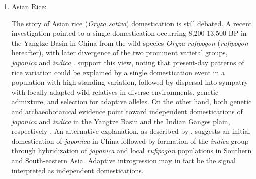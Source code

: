 \documentclass[11pt]{article}
\begin{document}
\begin{enumerate}







\item{Asian Rice:}

The story of Asian rice (\emph{Oryza sativa}) domestication is still debated.
A recent investigation pointed to a single domestication occurring 8,200-13,500 BP in the Yangtze Basin in China from the wild species \emph{Oryza rufipogon} (\emph{rufipogon} hereafter), with later divergence of the two prominent varietal groups, \emph{japonica} and \emph{indica} \cite{molina2011molecular}.
\cite{vaughan2008evolving} support this view, noting that present-day patterns of rice variation could be explained by a single domestication event in a population with high standing variation, followed by dispersal into sympatry with locally-adapted wild relatives in diverse environments, genetic admixture, and selection for adaptive alleles.
On the other hand, both genetic and archaeobotanical evidence point toward independent domestications of \emph{japonica} and \emph{indica} in the Yangtze Basin and the Indian Ganges plain, respectively \cite{fuller2010consilience}.
An alternative explanation, as described by \cite{Huang2012}, suggests an initial domestication of \emph{japonica} in China followed by formation of the \emph{indica} group through hybridization of \emph{japonica} and local \emph{rufipogon} populations in Southern and South-eastern Asia.
Adaptive introgression may in fact be the signal interpreted as independent domestications.




\end{enumerate}
\end{document}
